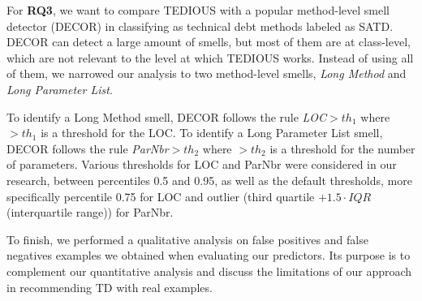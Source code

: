 For \textbf{RQ3}, we want to compare \ac{TEDIOUS} with a popular method-level smell detector (DECOR) \citep{moha2010decor} in classifying as technical debt methods labeled as \ac{SATD}. DECOR can detect a large amount of smells, but most of them are at class-level, which are not relevant to the level at which \ac{TEDIOUS} works. Instead of using all of them, we narrowed our analysis to two method-level smells, \textit{Long Method} and \textit{Long Parameter List}. 

To identify a Long Method smell, DECOR follows the rule {\em LOC}$>th_1$ where $>th_1$ is a threshold for the LOC. To identify a Long Parameter List smell, DECOR follows the rule {\em ParNbr}$>th_2$ where $>th_2$ is a threshold for the number of parameters. Various thresholds for LOC and ParNbr were considered in our research, between percentiles 0.5 and 0.95, as well as the default thresholds, more specifically percentile 0.75 for LOC and outlier (third quartile $+ 1.5 \cdot IQR$ (interquartile range)) for ParNbr.

To finish, we performed a qualitative analysis on false positives and false negatives examples we obtained when evaluating our predictors. Its purpose is to complement our quantitative analysis and discuss the limitations of our approach in recommending \ac{TD} with real examples.

























